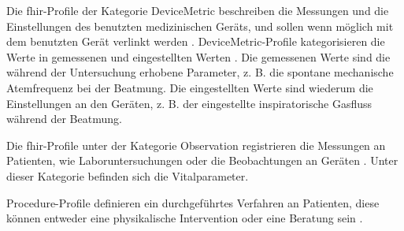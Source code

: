 Die \ac{fhir}-Profile der Kategorie \glqq DeviceMetric\grqq{} beschreiben die Messungen und die Einstellungen des benutzten medizinischen Geräts, und sollen wenn möglich mit dem benutzten Gerät verlinkt werden \cite{icukdz}. \glqq DeviceMetric\grqq{}-Profile kategorisieren die Werte in gemessenen und eingestellten Werten \cite{devicemetric}. Die gemessenen Werte sind die während der Untersuchung erhobene Parameter, z. B. die spontane mechanische Atemfrequenz bei der Beatmung. Die eingestellten Werte sind wiederum die Einstellungen an den Geräten, z. B. der eingestellte inspiratorische Gasfluss während der Beatmung.

Die \ac{fhir}-Profile unter der Kategorie \glqq Observation\grqq{} registrieren die Messungen an Patienten, wie Laboruntersuchungen oder die Beobachtungen an Geräten \cite{observation}. Unter dieser Kategorie befinden sich die Vitalparameter.

\glqq Procedure\grqq{}-Profile definieren ein durchgeführtes Verfahren an Patienten, diese können entweder eine physikalische Intervention oder eine Beratung sein \cite{procedure}.
